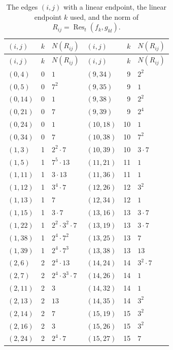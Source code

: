 \documentclass[11pt]{article}
\begin{document}
\begingroup\small
\setlength{\LTcapwidth}{\textwidth}
\begin{longtable}{@{}lrl@{\qquad}lrl@{}}
\caption{The edges $(i,j)$ with a linear endpoint, the linear endpoint $k$ used, and the norm of $R_{ij}=\operatorname{Res}_t(f_k,g_{kl})$.}\label{tab:csep}\\
\hline $(i,j)$ & $k$ & $N(R_{ij})$ & $(i,j)$ & $k$ & $N(R_{ij})$\\\hline\endfirsthead\hline $(i,j)$ & $k$ & $N(R_{ij})$ & $(i,j)$ & $k$ & $N(R_{ij})$\\\hline\endhead\hline\endfoot
$(0,4)$ & 0 & $1$ & $(9,34)$ & 9 & $2^{2}$\\
$(0,5)$ & 0 & $7^{2}$ & $(9,35)$ & 9 & $1$\\
$(0,14)$ & 0 & $1$ & $(9,38)$ & 9 & $2^{2}$\\
$(0,21)$ & 0 & $7$ & $(9,39)$ & 9 & $2^{4}$\\
$(0,24)$ & 0 & $1$ & $(10,18)$ & 10 & $1$\\
$(0,34)$ & 0 & $7$ & $(10,38)$ & 10 & $7^{2}$\\
$(1,3)$ & 1 & $2^{2}\cdot 7$ & $(10,39)$ & 10 & $3\cdot 7$\\
$(1,5)$ & 1 & $7^{5}\cdot 13$ & $(11,21)$ & 11 & $1$\\
$(1,11)$ & 1 & $3\cdot 13$ & $(11,36)$ & 11 & $1$\\
$(1,12)$ & 1 & $3^{4}\cdot 7$ & $(12,26)$ & 12 & $3^{2}$\\
$(1,13)$ & 1 & $7$ & $(12,34)$ & 12 & $1$\\
$(1,15)$ & 1 & $3\cdot 7$ & $(13,16)$ & 13 & $3\cdot 7$\\
$(1,22)$ & 1 & $2^{2}\cdot 3^{2}\cdot 7$ & $(13,19)$ & 13 & $3\cdot 7$\\
$(1,38)$ & 1 & $2^{4}\cdot 7^{2}$ & $(13,25)$ & 13 & $7$\\
$(1,39)$ & 1 & $2^{4}\cdot 7^{3}$ & $(13,38)$ & 13 & $13$\\
$(2,6)$ & 2 & $2^{4}\cdot 13$ & $(14,24)$ & 14 & $3^{2}\cdot 7$\\
$(2,7)$ & 2 & $2^{4}\cdot 3^{3}\cdot 7$ & $(14,26)$ & 14 & $1$\\
$(2,11)$ & 2 & $3$ & $(14,32)$ & 14 & $1$\\
$(2,13)$ & 2 & $13$ & $(14,35)$ & 14 & $3^{2}$\\
$(2,14)$ & 2 & $7$ & $(15,19)$ & 15 & $3^{2}$\\
$(2,16)$ & 2 & $3$ & $(15,26)$ & 15 & $3^{2}$\\
$(2,24)$ & 2 & $2^{4}\cdot 7$ & $(15,27)$ & 15 & $7$\\

\end{longtable}
\end{document}
